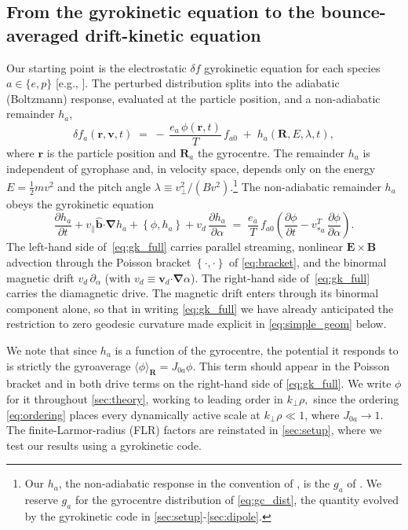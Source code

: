 \documentclass{jpp}
\newcommand{\bv}{\mathbf{v}}
\newcommand{\br}{\mathbf{r}}
\renewcommand{\vec}[1]{\boldsymbol{#1}}
\newcommand{\vec}[1]{\boldsymbol{#1}}
\newcommand{\uvec}[1]{\hat{\boldsymbol{#1}}}
\providecommand{\bcdot}{\vec{\cdot}}
\newcommand{\grad}{{\vec{\nabla}}}
\newcommand{\kperp}{k_\perp}
\newcommand{\vpar}{v_\parallel}
\newcommand{\pbra}[2]{\left\lbrace #1, #2 \right\rbrace}
\newcommand{\vE}{\vec{E}}
\newcommand{\vB}{\vec{B}}
\begin{document}
\subsection{From the gyrokinetic equation to the bounce-averaged drift-kinetic equation}\label{sec:gk_to_dke}

Our starting point is the electrostatic $\delta \! f$ gyrokinetic equation for each species $a \in \{e, p\}$ [e.g., \citet{Abel2013}]. The perturbed distribution splits into the adiabatic (Boltzmann) response, evaluated at the particle position, and a non-adiabatic remainder $h_a$,
\begin{equation}\label{eq:df_split}
\delta f_a(\br, \bv, t) \;=\; -\,\frac{e_a\,\phi(\br, t)}{T}\,f_{a0} \;+\; h_a(\mathbf{R}, E, \lambda, t),
\end{equation}
where $\br$ is the particle position and $\mathbf{R}_a$ the gyrocentre. The remainder $h_a$ is independent of gyrophase and, in velocity space, depends only on the energy $E = \tfrac12 m v^2$ and the pitch angle $\lambda \equiv v_\perp^2/(B v^2)$.\footnote{Our $h_a$, the non-adiabatic response in the convention of \citet{Abel2013}, is the $g_a$ of \citet{MPH2018}. We reserve $g_a$ for the gyrocentre distribution of \cref{eq:gc_dist}, the quantity evolved by the gyrokinetic code in \cref{sec:setup}-\cref{sec:dipole}.} The non-adiabatic remainder $h_a$ obeys the gyrokinetic equation
\begin{equation}\label{eq:gk_full}
\frac{\partial h_a}{\partial t} + \vpar \uvec{b}\bcdot\grad h_a + \pbra{\phi}{h_a} + v_d\,\frac{\partial h_a}{\partial \alpha} \;=\; \frac{e_a}{T}\,f_{a0}\left(\frac{\partial \phi}{\partial t} - v_{*a}^T\,\frac{\partial \phi}{\partial \alpha}\right).
\end{equation}
The left-hand side of~\cref{eq:gk_full} carries parallel streaming, nonlinear $\vE \times \vB$ advection through the Poisson bracket $\pbra{\cdot}{\cdot}$ of \cref{eq:bracket}, and the binormal magnetic drift $v_d\,\partial_\alpha$ (with $v_d \equiv \vec{v}_d\bcdot\grad\alpha$). The right-hand side of~\cref{eq:gk_full} carries the diamagnetic drive. The magnetic drift enters through its binormal component alone, so that in writing \cref{eq:gk_full} we have already anticipated the restriction to zero geodesic curvature made explicit in \cref{eq:simple_geom} below.

We note that since $h_a$ is a function of the gyrocentre, the potential it responds to is strictly the gyroaverage $\langle\phi\rangle_{\mathbf{R}} = J_{0a}\phi$. This term should appear in the Poisson bracket and in both drive terms on the right-hand side of \cref{eq:gk_full}. We write $\phi$ for it throughout \cref{sec:theory}, working to leading order in $\kperp\rho,$ since the ordering \cref{eq:ordering} places every dynamically active scale at $\kperp\rho \ll 1$, where $J_{0a}\to1$. The finite-Larmor-radius (FLR) factors are reinstated in \cref{sec:setup}, where we test our results using a gyrokinetic code.
\end{document}
